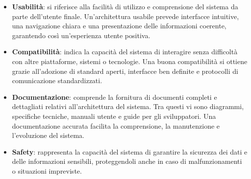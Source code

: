 \begin{itemize}
    \item \textbf{Usabilità}: si riferisce alla facilità di utilizzo e comprensione del sistema da parte dell'utente finale. Un'architettura usabile prevede interfacce intuitive, una navigazione chiara e una presentazione delle informazioni coerente, garantendo così un'esperienza utente positiva.
    \item \textbf{Compatibilità}: indica la capacità del sistema di interagire senza difficoltà con altre piattaforme, sistemi o tecnologie. Una buona compatibilità si ottiene grazie all'adozione di standard aperti, interfacce ben definite e protocolli di comunicazione standardizzati.
    \item \textbf{Documentazione}: comprende la fornitura di documenti completi e dettagliati relativi all'architettura del sistema. Tra questi vi sono diagrammi, specifiche tecniche, manuali utente e guide per gli sviluppatori. Una documentazione accurata facilita la comprensione, la manutenzione e l'evoluzione del sistema.
    \item \textbf{Safety}: rappresenta la capacità del sistema di garantire la sicurezza dei dati e delle informazioni sensibili, proteggendoli anche in caso di malfunzionamenti o situazioni impreviste.
\end{itemize}







